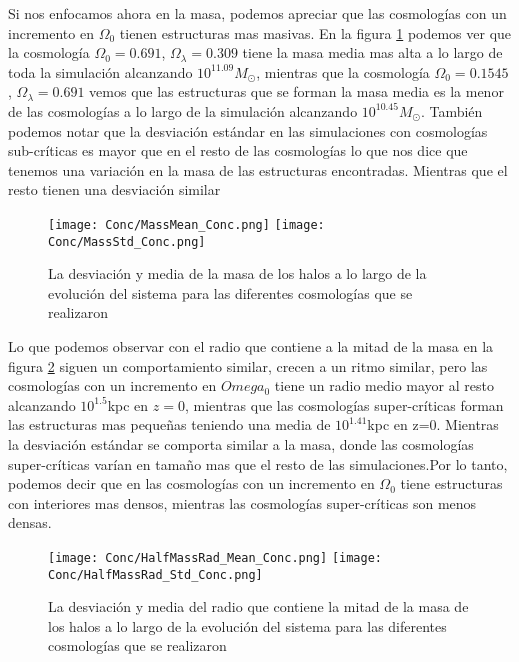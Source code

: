 Si nos enfocamos ahora en la masa, podemos apreciar que las cosmologías con un incremento en $\Omega_0$ tienen estructuras mas masivas. En la figura \ref{fig:Conc_Mass} podemos ver que la cosmología $\Omega_0=0.691$, $\Omega_\lambda=0.309$ tiene la masa media mas alta a lo largo de toda la simulación alcanzando $10^{11.09}M_\odot$, mientras que la cosmología $\Omega_0=0.1545$, $\Omega_\lambda=0.691$ vemos que las estructuras que se forman la masa media es la menor de las cosmologías a lo largo de la simulación alcanzando $10^{10.45} M_\odot$. También podemos notar que la desviación estándar en las simulaciones con cosmologías sub-críticas es mayor que en el resto de las cosmologías lo que nos dice que tenemos una variación en la masa de las estructuras encontradas. Mientras que el resto tienen una desviación similar 

\begin{figure}
      \centering
      \texttt{[image: Conc/MassMean\_Conc.png]}
      \texttt{[image: Conc/MassStd\_Conc.png]}
      \caption[Evolución de la desviación y media de la masa de los halos para todas las cosmologías]{La desviación y media de la masa de los halos a lo largo de la evolución del sistema para las diferentes cosmologías que se realizaron}
      \label{fig:Conc_Mass}
\end{figure}

Lo que podemos observar con el radio que contiene a la mitad de la masa en la figura \ref{fig:Conc_HalfMassRad} siguen un comportamiento similar, crecen a un ritmo similar, pero las cosmologías con un incremento en $Omega_0$ tiene un radio medio mayor al resto alcanzando $10^1.5$kpc en $z=0$, mientras que las cosmologías super-críticas forman las estructuras mas pequeñas teniendo una media de $10^1.41$kpc en z=0. Mientras la desviación estándar se comporta similar a la masa, donde las cosmologías super-críticas varían en tamaño mas que el resto de las simulaciones.Por lo tanto, podemos decir que en las cosmologías con un incremento en $\Omega_0$ tiene estructuras con interiores mas densos, mientras las cosmologías super-críticas son menos densas.

\begin{figure}
      \centering
      \texttt{[image: Conc/HalfMassRad\_Mean\_Conc.png]}
      \texttt{[image: Conc/HalfMassRad\_Std\_Conc.png]}
      \caption[Evolución de la desviación y media del radio que contiene la mitad de la masa de los halos para todas las cosmologías]{La desviación y media del radio que contiene la mitad de la masa de los halos a lo largo de la evolución del sistema para las diferentes cosmologías que se realizaron}
      \label{fig:Conc_HalfMassRad}
\end{figure}

